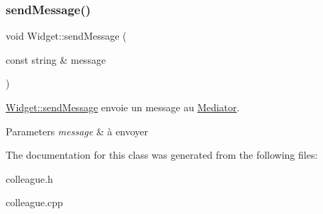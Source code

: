 \subsubsection{\texorpdfstring{send\+Message()}{sendMessage()}}
{\footnotesize\ttfamily void Widget\+::send\+Message (\begin{DoxyParamCaption}\item[{const string \&}]{message }\end{DoxyParamCaption})\hspace{0.3cm}{\ttfamily [virtual]}}



\hyperlink{classWidget_a3f249ee26ae63058896027c045477804}{Widget\+::send\+Message} envoie un message au \hyperlink{classMediator}{Mediator}. 


\begin{DoxyParams}{Parameters}
{\em message} & à envoyer \\
\hline
\end{DoxyParams}


The documentation for this class was generated from the following files\+:\begin{DoxyCompactItemize}
\item 
colleague.\+h\item 
colleague.\+cpp\end{DoxyCompactItemize}
